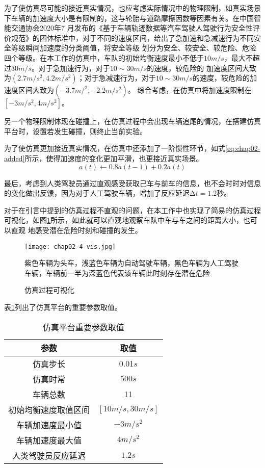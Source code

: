 为了使仿真尽可能的接近真实情况，也应考虑实际情况中的物理限制，如真实场景下车辆的加速度大小是有限制的，这与轮胎与道路摩擦因数等因素有关。在中国智能交通协会2020年7
月发布的《基于车辆轨迹数据等汽车驾驶人驾驶行为安全性评价规范》的团体标准中，对于不同的速度区间，给出了急加速和急减速行为不同安全等级瞬间加速度的分类阈值，将安全等级
划分为安全、较安全、较危险、危险四个等级。在本工作的仿真中，车队的初始均衡速度最小不低于$10m/s$，最大不超过$30m/s$。对于急加速行为，对于$10\sim 30m/s$的速度，较危险的
加速度区间大致为$(2.7m/s^2, 4.2m/s^2)$；对于急减速行为，对于$10\sim 30m/s$的速度，较危险的加速度区间大致为$(-3.7m/^2, -2.2m/s^2)$\cite{2020safety}。
综合考虑，在仿真中将加速度限制在$[-3m/s^2, 4m/s^2]$。

另一个物理限制体现在碰撞上，在仿真过程中会出现车辆追尾的情况，在搭建仿真平台时，设置若发生碰撞，则终止当前实验。

为了使仿真更加接近真实情况，在仿真中还添加了一阶惯性环节，如式\ref{eq:chap02-added}所示，使得加速度的变化更加平滑，也更接近真实场景。
\begin{equation}
  a(t) \leftarrow 0.8a(t-1) + 0.2a(t)
  \label{eq:chap02-added}
\end{equation}

最后，考虑到人类驾驶员通过直观感受获取己车与前车的信息，也不会时时对信息的变化做出反馈，因为对于人工驾驶车辆，增加了反应延迟$\increment{t} = 1.2$秒。

对于在引言中提到的仿真过程不直观的问题，在本工作中也实现了简易的仿真过程可视化，如图\ref{fig:chap02-4-vis}所示，如此就可以直观地观察车队中车与车之间的距离大小，也可以直观
地感受潜在危险时刻和碰撞的发生。

\begin{figure}
  \centering
  \texttt{[image: chap02-4-vis.jpg]}
  \caption*{紫色车辆为头车，浅蓝色车辆为自动驾驶车辆，黑色车辆为人工驾驶车辆，车辆前一半为深蓝色代表该车辆此时刻存在潜在危险}
  \caption{仿真过程可视化}
  \label{fig:chap02-4-vis}
\end{figure}

表\ref{tab:chap02-3}列出了仿真平台的重要参数取值。

\begin{table}
  \centering
  \caption{仿真平台重要参数取值}
  \begin{tabular}{cc}
    \toprule
    参数                   &  取值                         \\
    \midrule
    仿真步长                & 0.01$s$         \\
    仿真时常                & $500s$             \\
    车辆总数                & 11              \\
    初始均衡速度取值区间      & $[10m/s, 30m/s]$        \\
    车辆加速度最小值         & $-3m/s^2$     \\
    车辆加速度最大值         & $4m/s^2$ \\
    人类驾驶员反应延迟       & $1.2s$ \\
    \bottomrule
  \end{tabular}
  \label{tab:chap02-3}
\end{table}

